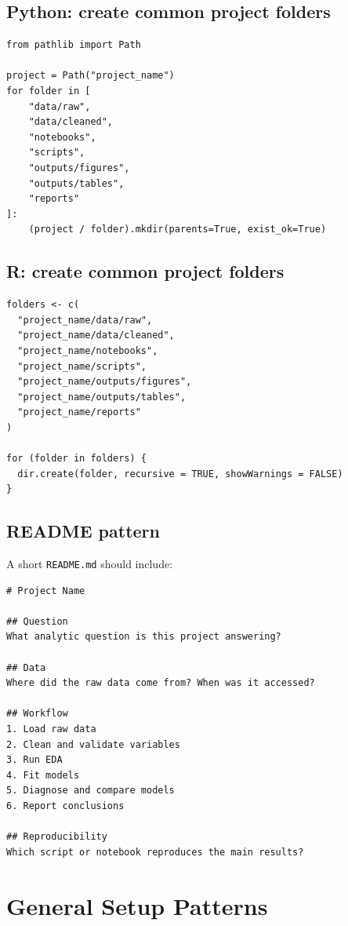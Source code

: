 \subsection*{Python: create common project folders}

\begin{verbatim}
from pathlib import Path

project = Path("project_name")
for folder in [
    "data/raw",
    "data/cleaned",
    "notebooks",
    "scripts",
    "outputs/figures",
    "outputs/tables",
    "reports"
]:
    (project / folder).mkdir(parents=True, exist_ok=True)
\end{verbatim}

\subsection*{R: create common project folders}

\begin{verbatim}
folders <- c(
  "project_name/data/raw",
  "project_name/data/cleaned",
  "project_name/notebooks",
  "project_name/scripts",
  "project_name/outputs/figures",
  "project_name/outputs/tables",
  "project_name/reports"
)

for (folder in folders) {
  dir.create(folder, recursive = TRUE, showWarnings = FALSE)
}
\end{verbatim}

\subsection*{README pattern}

A short \texttt{README.md} should include:

\begin{verbatim}
# Project Name

## Question
What analytic question is this project answering?

## Data
Where did the raw data come from? When was it accessed?

## Workflow
1. Load raw data
2. Clean and validate variables
3. Run EDA
4. Fit models
5. Diagnose and compare models
6. Report conclusions

## Reproducibility
Which script or notebook reproduces the main results?
\end{verbatim}

\section{General Setup Patterns}
\label{app:cookbook-general-setup}

